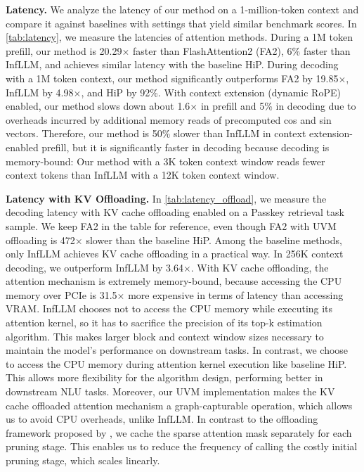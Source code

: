 \textbf{Latency.}
We analyze the latency of our method on a 1-million-token context and compare it against baselines with settings that yield similar benchmark scores. In \cref{tab:latency}, we measure the latencies of attention methods.
During a 1M token prefill, our method is 20.29$\times$ faster than FlashAttention2 (FA2), 6\% faster than InfLLM, and achieves similar latency with the baseline HiP.
During decoding with a 1M token context, our method significantly outperforms FA2 by 19.85$\times$, InfLLM by 4.98$\times$, and HiP by 92\%.
With context extension (dynamic RoPE) enabled, our method slows down about 1.6$\times$ in prefill and 5\% in decoding due to overheads incurred by additional memory reads of precomputed cos and sin vectors.
Therefore, our method is 50\% slower than InfLLM in context extension-enabled prefill, but it is significantly faster in decoding because decoding is memory-bound:
Our method with a 3K token context window reads fewer context tokens than InfLLM with a 12K token context window.

\textbf{Latency with KV Offloading.} In \cref{tab:latency_offload}, we measure the decoding latency with KV cache offloading enabled on a Passkey retrieval task sample.
We keep FA2 in the table for reference, even though FA2 with UVM offloading is 472$\times$ slower than the baseline HiP.
Among the baseline methods, only InfLLM achieves KV cache offloading in a practical way.
In 256K context decoding, we outperform InfLLM by 3.64$\times$.
With KV cache offloading, the attention mechanism is extremely memory-bound, because accessing the CPU memory over PCIe is 31.5$\times$ more expensive in terms of latency than accessing VRAM.
InfLLM chooses not to access the CPU memory while executing its attention kernel, so it has to sacrifice the precision of its top-k estimation algorithm. This makes larger block and context window sizes necessary to maintain the model's performance on downstream tasks.
In contrast, we choose to access the CPU memory during attention kernel execution like baseline HiP.
This allows more flexibility for the algorithm design, performing better in downstream NLU tasks.
Moreover, our UVM implementation makes the KV cache offloaded attention mechanism a graph-capturable operation, which allows us to avoid CPU overheads, unlike InfLLM.
In contrast to the offloading framework proposed by \citet{lee_training-free_2024}, we cache the sparse attention mask separately for each pruning stage. 
This enables us to reduce the frequency of calling the costly initial pruning stage, which scales linearly.

